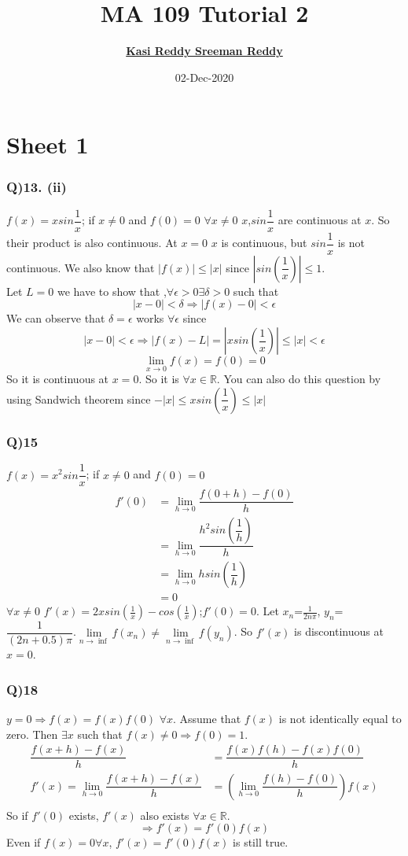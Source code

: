 \documentclass[11pt]{beamer}
\author[K. Sreeman Reddy]{\href{http://iamsreeman.github.io/}{\textbf{Kasi Reddy Sreeman Reddy}}\linebreak\text{2nd year physics student}\linebreak\text{\href{http://iamsreeman.github.io/MA109}{http://iamsreeman.github.io/MA109}}}
\title{MA 109 Tutorial 2}
\institute[]{IIT Bombay}
\date{02-Dec-2020}
\begin{document}
\begin{frame}
\titlepage
\end{frame}


\section{Sheet 1}
\begin{frame}
\frametitle{Q)13. (ii)}
$f(x) = xsin\dfrac{1}{x}$; if $x \neq 0$ and $f(0) = 0$
$\forall x\neq 0$ $x$,$sin\dfrac{1}{x}$ are continuous at $x$. So their product is also continuous. At $x=0$ $x$ is continuous, but $sin\dfrac{1}{x}$ is not continuous.
We also know that $|f(x)|\leq |x| $ since $|sin(\dfrac{1}{x})|\leq 1$.\\
Let $L=0$ we have to show that ,$\forall \epsilon >0 \exists \delta >0$ such that
$$|x-0|<\delta \Rightarrow |f(x)-0|<\epsilon $$
We can observe that $\delta=\epsilon$ works $\forall \epsilon$ since
$$|x-0|<\epsilon \Rightarrow |f(x)-L|=|xsin(\dfrac{1}{x})|\leq |x|<\epsilon $$
$$\underset{x \to 0}{\lim}f(x)=f(0)=0$$
So it is continuous at $x=0$. So it is $\forall x\in \mathbb{R}$. You can also do this question by using Sandwich theorem since $-|x|\leq xsin(\dfrac{1}{x})\leq |x|$
\end{frame}
\begin{frame}
\frametitle{Q)15}
$f(x) = x^2sin\dfrac{1}{x}$; if $x \neq 0$ and $f(0) = 0$
\begin{align*}
f'(0)&=\underset{h \to 0}{\lim}\dfrac{f(0+h)-f(0)}{h}\\
&=\underset{h \to 0}{\lim}\dfrac{h^2sin(\dfrac{1}{h})}{h}\\
&=\underset{h \to 0}{\lim}hsin(\dfrac{1}{h})\\
&=0
\end{align*}
$\forall x\neq 0$ $f'(x)=2xsin(\frac{1}{x})-cos(\frac{1}{x})$;$f'(0)=0$. Let {$x_n$}={$\frac{1}{2n\pi}$}, $y_n$={$\dfrac{1}{(2n+0.5)\pi}$}.$\underset{n \to \inf}{\lim}f(x_n)\neq \underset{n \to \inf}{\lim}f(y_n)$. So $f'(x)$ is discontinuous at $x=0$.
\end{frame}
\begin{frame}
\frametitle{Q)18}
$y=0\Rightarrow f(x)=f(x)f(0)$ $\forall x$. Assume that $f(x)$ is not identically equal to zero. Then $\exists x$ such that $f(x)\neq 0\Rightarrow f(0)=1$.
\begin{align*}
\dfrac{f(x+h)-f(x)}{h}&=\dfrac{f(x)f(h)-f(x)f(0)}{h}\\
f'(x)=\underset{h \to 0}{\lim}\dfrac{f(x+h)-f(x)}{h}&=\left(\underset{h \to 0}{\lim}\dfrac{f(h)-f(0)}{h}\right) f(x)\\
\end{align*}
So if $f'(0)$ exists, $f'(x)$ also exists $\forall x \in \mathbb{R}$.
$$\Rightarrow f'(x)=f'(0)f(x)$$
Even if $f(x)=0 \forall x$, $f'(x)=f'(0)f(x)$ is still true.
\end{frame}
\end{document}
